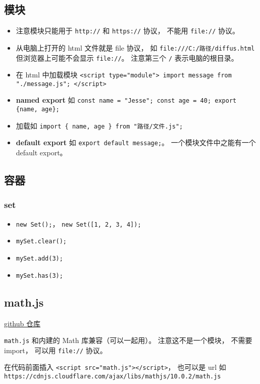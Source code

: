 \subsection{模块}
\begin{itemize}
\item 注意模块只能用于 \verb|http://| 和 \verb|https://| 协议， 不能用 \verb|file://| 协议。
\item 从电脑上打开的 html 文件就是 file 协议， 如 \verb|file:///C:/路径/diffus.html| 但浏览器上可能不会显示 \verb|file://|。 注意第三个 \verb|/| 表示电脑的根目录。
\item 在 html 中加载模块 \verb|<script type="module"> import message from "./message.js"; </script>|
\item \textbf{named export} 如 \verb|const name = "Jesse"; const age = 40; export {name, age};|
\item 加载如 \verb|import { name, age } from "路径/文件.js";|
\item \textbf{default export} 如 \verb|export default message;|。 一个模块文件中之能有一个 default export。
\end{itemize}

\subsection{容器}
\subsubsection{set}
\begin{itemize}
\item \verb`new Set();`， \verb`new Set([1, 2, 3, 4]);`
\item \verb`mySet.clear();`
\item \verb`mySet.add(3);`
\item \verb`mySet.has(3);`
\end{itemize}


\subsection{math.js}
\href{https://github.com/josdejong/mathjs}{github 仓库}

\verb|math.js| 和内建的 Math 库兼容（可以一起用）。 注意这不是一个模块， 不需要 import， 可以用 \verb|file://| 协议。

在代码前面插入 \verb|<script src="math.js"></script>|， 也可以是 url 如 \verb|https://cdnjs.cloudflare.com/ajax/libs/mathjs/10.0.2/math.js|

